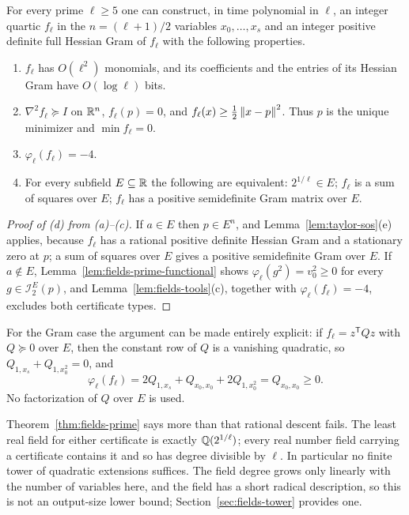 \begin{theorem}
\label{thm:fields-prime}
For every prime $\ell\ge5$ one can construct, in time polynomial in $\ell$,
an integer quartic $f_\ell$ in the $n=(\ell+1)/2$ variables $x_0,\ldots,x_s$
and an integer positive definite full Hessian Gram of $f_\ell$ with the
following properties.
\begin{enumerate}[label=(\alph*)]
\item $f_\ell$ has $O(\ell^2)$ monomials, and its coefficients and the
  entries of its Hessian Gram have $O(\log\ell)$ bits.
\item $\nabla^2f_\ell\succeq I$ on $\mathbb R^n$, $f_\ell(p)=0$, and
  $f_\ell(x)\ge\frac12\left\lVert x-p\right\rVert^2$. Thus $p$ is the unique minimizer and
  $\min f_\ell=0$.
\item $\varphi_\ell(f_\ell)=-4$.
\item For every subfield $E\subseteq\mathbb R$ the following are equivalent:
  $2^{1/\ell}\in E$; $f_\ell$ is a sum of squares over $E$; $f_\ell$ has a
  positive semidefinite Gram matrix over $E$.
\end{enumerate}
\end{theorem}

\begin{proof}[Proof of (d) from (a)--(c)]
If $a\in E$ then $p\in E^n$, and Lemma~\ref{lem:taylor-sos}(e) applies,
because $f_\ell$ has a rational positive definite Hessian Gram and a
stationary zero at $p$; a sum of squares over $E$ gives a positive
semidefinite Gram over $E$. If $a\notin E$, Lemma~\ref{lem:fields-prime-functional}
shows $\varphi_\ell(g^2)=v_0^2\ge0$ for every $g\in\mathcal I_2^E(p)$, and
Lemma~\ref{lem:fields-tools}(c), together with $\varphi_\ell(f_\ell)=-4$,
excludes both certificate types.
\end{proof}

For the Gram case the argument can be made entirely explicit: if
$f_\ell=z^{\mathsf T}Qz$ with $Q\succeq0$ over $E$, then the constant row of
$Q$ is a vanishing quadratic, so $Q_{1,x_s}+Q_{1,x_0^2}=0$, and
\[
 \varphi_\ell(f_\ell)=2Q_{1,x_s}+Q_{x_0,x_0}+2Q_{1,x_0^2}=Q_{x_0,x_0}\ge0 .
\]
No factorization of $Q$ over $E$ is used.

Theorem~\ref{thm:fields-prime} says more than that rational descent fails.
The least real field for either certificate is exactly $\mathbb Q(2^{1/\ell})$;
every real number field carrying a certificate contains it and so has
degree divisible by $\ell$. In particular no finite tower of quadratic
extensions suffices. The field degree grows only linearly with the number of
variables here, and the field has a short radical description, so this is
not an output-size lower bound; Section~\ref{sec:fields-tower} provides one.

